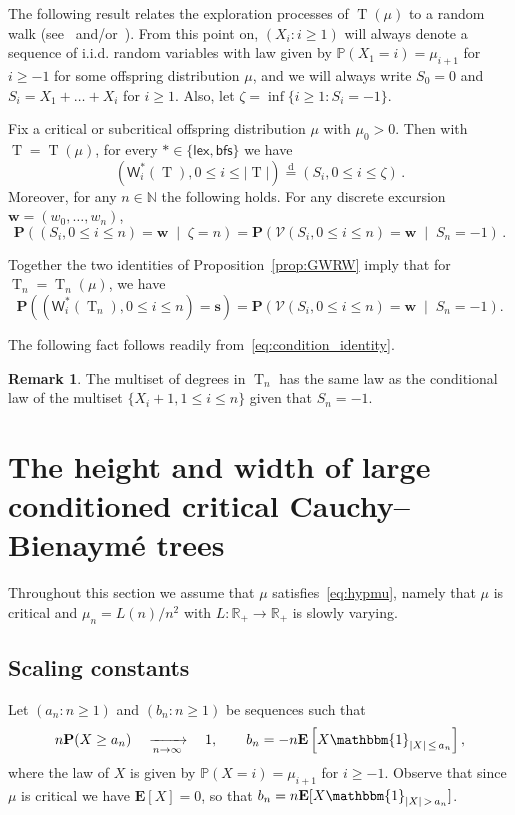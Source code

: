 \documentclass[10pt]{amsart}
\theoremstyle{definition}\newtheorem{defi}[theo]{Definition}\newtheorem{rema}[theo]{Remark}\newtheorem{exam}[theo]{Example}\newtheorem{exem}[theo]{Example}\newtheorem{nota}[theo]{Notation}
\newcommand{\R}{\mathbb{R}}
\newcommand{\N}{\mathbb{N}}
\renewcommand{\P}{\mathbb{P}}
\newcommand*\W{\mathsf{W}}
\newcommand{\bfs}{\mathsf{bfs}}
\newcommand{\p}{\mathbf{P}}
\newcommand{\bfw}{\mathbf{w}}
\newcommand{\bffs}{\mathbf{s}}
\newcommand{\lex}{\mathsf{lex}}
\newcommand{\E}[1]{{\mathbf E}\left[#1\right]}
\newcommand{\bfE}{\mathbf{E}}
\DeclareMathOperator{\rtree}{T}
\newcommand{\cV}{\mathcal{V}}
\newcommand{\set}[1]{\left(#1 \right)}
\newcommand{\Cprob}[2]{\mathbf{P}\set{\left. #1 \; \middle| \; #2\right.}}
\newcommand{\eqdist}{\ensuremath{\stackrel{\mathrm{d}}{=}}}
\begin{document}
The following result relates the exploration processes of $\rtree(\mu)$ to a random walk (see~\cite[Proposition~1.5]{LG05} and/or~\cite[Chapter~5 Exercise~1]{MR2245368}). From this point on, $(X_{i} : i \geq 1)$ will always denote a sequence of i.i.d. random variables with law given by $\P(X_{1}=i)=\mu_{i+1}$ for $i \geq -1$ for some offspring distribution $\mu$, and we will always write $S_0=0$ and $S_i=X_1+\ldots+X_i$ for $i \ge 1$. Also, let $\zeta=\inf\{i \ge 1: S_i = -1\}$.
\begin{prop}\label{prop:GWRW}
Fix a critical or subcritical offspring distribution $\mu$ with $\mu_0>0$. Then with $\rtree=\rtree(\mu)$, for every $\ast \in \{\lex,\bfs\}$ we have
\[
\left(\W^{\ast}_{i}(\rtree),0 \le i \le |\rtree|\right)\eqdist (S_i,0 \le i \le \zeta)\,.
\]
Moreover, for any $n \in \N$ the following holds. For any discrete excursion $\bfw=(w_0,\ldots,w_n)$,
\[
\Cprob{(S_i,0 \le i \le n)=\bfw}{\zeta=n} =\Cprob{\cV(S_i,0 \le i \le n)=\bfw}{S_n=-1}\,.
\]
\end{prop}

Together the two identities of Proposition~\ref{prop:GWRW} imply that for $\rtree_n=\rtree_n(\mu)$, we have
\begin{equation}\label{eq:condition_identity}
\p\left((\W^{\ast}_{i}(\rtree_n),0 \le i \le n)=\bffs\right) =
\Cprob{\cV(S_i,0 \le i \le n)=\bfw}{S_n=-1}.
\end{equation}

The following fact follows readily from~\eqref{eq:condition_identity}.
\begin{rema}\label{rk:degrees}
The multiset of degrees in $\rtree_n$ has the same law as the conditional law of the multiset $\{X_i+1,1 \le i \le n\}$ given that $S_n=-1$.
\end{rema}



\section{The height and width of large conditioned critical Cauchy--Bienaymé trees}\label{sec:cauchy_trees}

Throughout this section we assume that $\mu$ satisfies~\eqref{eq:hypmu}, namely that $\mu$ is critical and $\mu_n=L(n)/n^{2}$ with $L : \R_{+} \rightarrow \R_{+}$ is slowly varying.

\subsection{Scaling constants}\label{sec:scalingconstants}
Let $(a_{n} : n \geq 1)$ and $(b_{n} : n \geq 1)$ be sequences such that
\begin{equation}\label{eq:defanbn}
n \p(X \geq a_{n}) \quad \xrightarrow[n\to\infty]{} \quad 1, \qquad b_{n}=-n \E{X \mathbbm{1}_{|X|\, \leq \,a_{n}}},
\end{equation}
where the law of $X$ is given by $\P(X=i)=\mu_{i+1}$ for $i \geq -1$. Observe that since $\mu$ is critical we have $\E{X}=0$, so that $b_{n}=n \bfE[X \mathbbm{1}_{|X|\,>\,a_{n}}]$.
\end{document}
